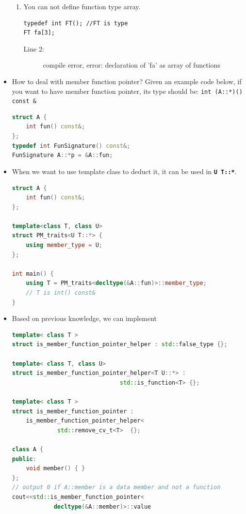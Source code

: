 \documentclass[a4paper,11pt,twoside]{book}
\begin{document}
\begin{itemize}
\begin{enumerate}
	\item You can not define function type array.
\begin{lstlisting}
typedef int FT(); //FT is type
FT fa[3]; 
\end{lstlisting}
	\begin{description}
		\item[Line 2:] compile error, error: declaration of 'fa' as array of functions
	\end{description}
\end{enumerate}

	\item How to deal with member function pointer? Given an example code below, if you want to have member function pointer, its type should be: \texttt{int (A::*)() const \&} 
\begin{lstlisting}[frame=single, language=c++]
struct A {
	int fun() const&;
};
typedef int FunSignature() const&;
FunSignature A::*p = &A::fun;
\end{lstlisting}
\item When we want to use template class to deduct it, it can be used in \textbf{\texttt{U T::*}}.
\begin{lstlisting}[frame=single, language=c++]
struct A {
	int fun() const&;
};

template<class T, class U>
struct PM_traits<U T::*> {
	using member_type = U;
};

int main() {
	using T = PM_traits<decltype(&A::fun)>::member_type; 
	// T is int() const&
}
\end{lstlisting}
	
	\item Based on previous knowledge, we can implement 
\begin{lstlisting}[frame=single, language=c++]
template< class T >
struct is_member_function_pointer_helper : std::false_type {};
	
template< class T, class U>
struct is_member_function_pointer_helper<T U::*> :
                               std::is_function<T> {};
	
template< class T >
struct is_member_function_pointer : 
    is_member_function_pointer_helper<
    		 std::remove_cv_t<T>  {};
	
class A {
public:
	void member() { }
};
// output 0 if A::member is a data member and not a function
cout<<std::is_member_function_pointer<
			decltype(&A::member)>::value
\end{lstlisting}
	

\end{itemize}
\end{document}
